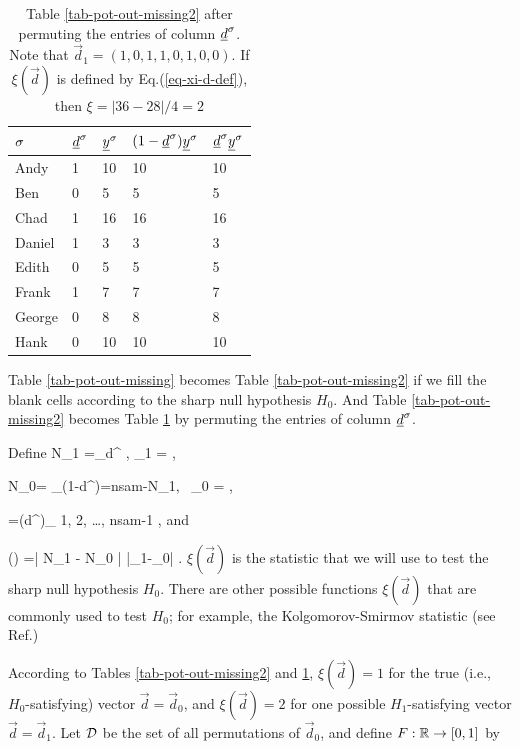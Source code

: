 \begin{table}[h!]
\centering
\begin{tabular}{|l|l|l|l|l|}
\hline
\rowcolor[HTML]{ECF4FF} 
$\sigma$ & ${\underline{d}}^\sigma$ & ${\underline{y}}^\sigma$ & $(1-{\underline{d}}^\sigma){\underline{y}}^\sigma$ & ${\underline{d}}^\sigma{\underline{y}}^\sigma$ \\ \hline
Andy & \cellcolor[HTML]{FFFFC7}1 & 10 & 10 & 10 \\ \hline
Ben & 0 & 5 & 5 & 5 \\ \hline
Chad & \cellcolor[HTML]{FFFFC7}1 & 16 & 16 & 16 \\ \hline
Daniel & \cellcolor[HTML]{FFFFC7}1 & 3 & 3 & 3 \\ \hline
Edith & 0 & 5 & 5 & 5 \\ \hline
Frank & \cellcolor[HTML]{FFFFC7}1 & 7 & 7 & 7 \\ \hline
George & 0 & 8 & 8 & 8 \\ \hline
Hank & 0 & 10 & 10 & 10 \\ \hline
\end{tabular}
\caption{Table \ref{tab-pot-out-missing2}
after permuting the entries of column ${\underline{d}}^\sigma$.
Note that
$\vec{d}_1=(1,0,1,1,0,1,0,0)$.
If  $\xi(\vec{d})$
is defined by Eq.(\ref{eq-xi-d-def}), then
$\xi=|36-28|/4=2$}
\label{tab-pot-out-missing3}
\end{table}

Table \ref{tab-pot-out-missing} becomes
Table \ref{tab-pot-out-missing2}
if we fill the blank cells
according to the
sharp null hypothesis $H_0$.
And Table \ref{tab-pot-out-missing2}
becomes  Table \ref{tab-pot-out-missing3}
by permuting
the entries of column ${\underline{d}}^\sigma$.

Define
\beq
N_1 =\sum_\s d^\s
,\;\;\; \pi_1 = 
\;,
\eeq

\beq
N_0= \sum_\s (1-d^\s)=nsam-N_1,
\;\;\
\pi_0 = 
\;,
\eeq

 
\beq
{}=(d^\s)_{ 1, 2, \ldots, nsam-1}
\;,
\eeq
and


\beq
\xi() =\left|
{N_1}
-
{N_0}
\right|
\rarrow |\caly_1-\caly_0|
\label{eq-xi-d-def}
\;.
\eeq
$\xi(\vec{d})$
is the statistic
that we will use to 
test the sharp null hypothesis $H_0$.
There are other
possible functions $\xi(\vec{d})$
that are commonly used 
to test $H_0$; for example,
the Kolgomorov-Smirmov statistic 
(see Ref.\cite{book-mixtape})

According
to Tables
\ref{tab-pot-out-missing2}
and
\ref{tab-pot-out-missing3}, 
$\xi(\vec{d})=1$
for the true (i.e., $H_0$-satisfying) 
 vector $\vec{d}=\vec{d}_0$,
and $\xi(\vec{d})=2$ for
one possible
$H_1$-satisfying vector  
$\vec{d}=\vec{d}_1$.
Let ${\cal D}$ be the
set of all permutations of $\vec{d}_0$,
and define $F:{ \mathbb{R}}\rightarrow [0,1]$ by


